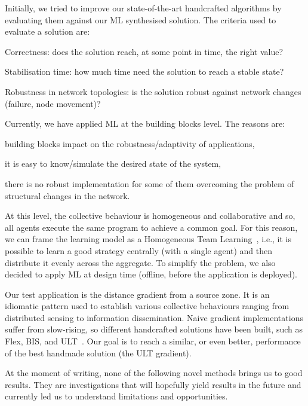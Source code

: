 \documentclass[conference]{IEEEtran}
\begin{document}
Initially, we tried to improve our state-of-the-art handcrafted algorithms by evaluating them against our ML synthesised solution.
%
The criteria used to evaluate a solution are:
\begin{enumerate*}[label=(\roman*)]
    \item Correctness: does the solution reach, at some point in time, the right value?
    \item Stabilisation time: how much time need the solution to reach a stable state?
    \item Robustness in network topologies: is the solution robust against network changes (failure, node movement)?
\end{enumerate*}

Currently, we have applied ML at the building blocks level.
The reasons are:
\begin{enumerate*}[label=(\roman*)]
\item building blocks impact on the robustness/adaptivity of applications,
\item it is easy to know/simulate the desired state of the system,
\item there is no robust implementation for some of them overcoming the problem of structural changes in the network.
\end{enumerate*}
%
At this level, the collective behaviour is homogeneous and collaborative and so, all agents execute the same program to achieve a common goal.
%
For this reason, we can frame the learning model as a Homogeneous Team Learning~\cite{DBLP:journals/aamas/PanaitL05}, i.e., it is possible to learn a good strategy centrally (with a single agent) and then distribute it evenly across the aggregate.
%
To simplify the problem, we also decided to apply ML at design time (offline, before the application is deployed).

Our test application is the distance gradient from a source zone. %
%
It is an idiomatic pattern used to establish various collective behaviours ranging from distributed sensing to information dissemination.
%
Naive gradient implementations suffer from slow-rising, so different handcrafted solutions have been built, such as Flex, BIS, and ULT~\cite{DBLP:conf/saso/AudritoCDV17}.
%
Our goal is to reach a similar, or even better, performance of the best handmade solution (the ULT gradient).

At the moment of writing, none of the following novel methods brings us to good results. They are investigations that will hopefully yield results in the future and currently led us to understand limitations and opportunities.
\end{document}
